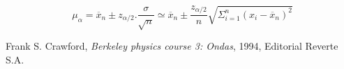 \documentclass[11pt,a4paper]{article}
\begin{document}
\begin{equation}\label{inter_final}
\ \mu_{\alpha} = \overline{x}_n \pm z_{\alpha/2}.\frac{\sigma}{\sqrt{n}} \simeq \overline{x}_n \pm \frac{z_{\alpha/2}}{n} \sqrt{\Sigma_{i=1}^{n}(x_i-\overline{x}_n)^2}
\end{equation}



\begin{thebibliography}{1}
  Frank S. Crawford, \textit{Berkeley physics course 3: Ondas}, 1994, Editorial Reverte S.A.
\end{thebibliography}
 
\end{document}

